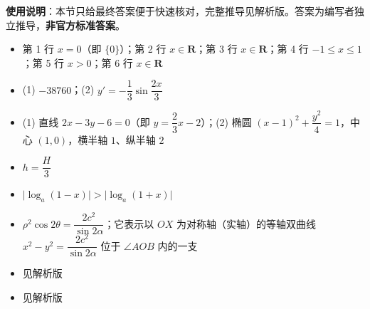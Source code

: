 
\begin{gknotice}
\textbf{使用说明}：本节只给最终答案便于快速核对，完整推导见解析版。答案为编写者独立推导，\textbf{非官方标准答案}。
\end{gknotice}

\begin{itemize}[leftmargin=2.6em]
  \item[\textbf{1.}] 第 1 行 $x=0$（即 $\{0\}$）；第 2 行 $x\in\mathbf{R}$；第 3 行 $x\in\mathbf{R}$；第 4 行 $-1\leqslant x\leqslant1$；第 5 行 $x>0$；第 6 行 $x\in\mathbf{R}$
  \item[\textbf{2.}] (1) $-38760$；(2) $y'=-\dfrac13\sin\dfrac{2x}{3}$
  \item[\textbf{3.}] (1) 直线 $2x-3y-6=0$（即 $y=\dfrac23x-2$）；(2) 椭圆 $(x-1)^2+\dfrac{y^2}{4}=1$，中心 $(1,0)$，横半轴 $1$、纵半轴 $2$
  \item[\textbf{4.}] $h=\dfrac H3$
  \item[\textbf{5.}] $\lvert\log_a(1-x)\rvert>\lvert\log_a(1+x)\rvert$
  \item[\textbf{6.}] $\rho^2\cos2\theta=\dfrac{2c^2}{\sin2\alpha}$；它表示以 $OX$ 为对称轴（实轴）的等轴双曲线 $x^2-y^2=\dfrac{2c^2}{\sin2\alpha}$ 位于 $\angle AOB$ 内的一支
  \item[\textbf{7.}] 见解析版
  \item[\textbf{8.}] 见解析版
\end{itemize}
